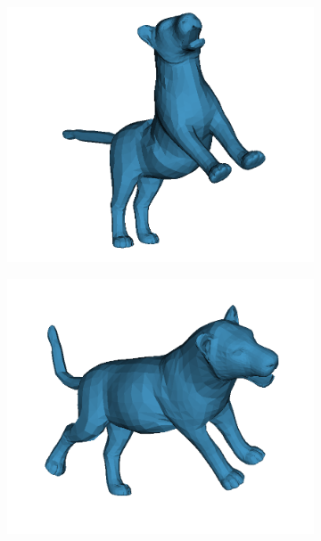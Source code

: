             \begin{figure}[H]
            \centering
            \begin{subfigure}{0.3\linewidth}
            \centering
                \includegraphics[width=1\linewidth]{smal/pose_1}
            \end{subfigure}%
            \begin{subfigure}{0.3\linewidth}
            \centering
                \includegraphics[width=1\linewidth]{smal/pose_2}
            \end{subfigure}%

\end{figure}
